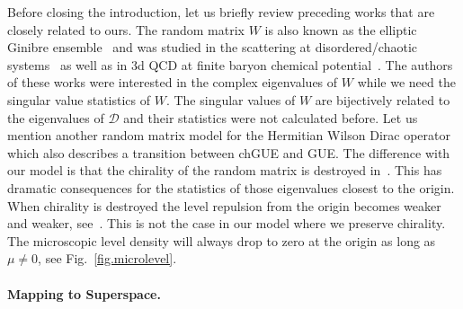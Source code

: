 \documentclass[aps,prl,reprint,graphicx,showpacs]{revtex4-1}
\begin{document}
Before closing the introduction, let us briefly review preceding works that are closely related to ours. 
The random matrix $W$ is also known as the elliptic Ginibre ensemble~\cite{Fyodorov:1997,Akemann:2001bf,Akemann:2007rf} and was studied in the scattering at disordered/chaotic systems~\cite{Fyodorov:1997b} as well as in 3d QCD at finite baryon chemical potential~\cite{Akemann:2001bf,Akemann:2007rf}. The authors of these works were interested in the complex eigenvalues of $W$ while we need the singular value statistics of $W$. The singular values of $W$ are bijectively related to the eigenvalues of $\mathcal{D}$ and their statistics were not calculated before. Let us mention another random matrix model for the Hermitian Wilson Dirac operator~\cite{Damgaard:2010cz,Akemann:2011} which also describes a transition between chGUE and GUE.  The difference with our model is that the chirality of the random matrix is destroyed in~\cite{Damgaard:2010cz,Akemann:2011}. This has dramatic consequences for the statistics of those eigenvalues closest to the origin. When chirality is destroyed the level repulsion from the origin becomes weaker and weaker, see~\cite{Damgaard:2010cz,Akemann:2011}. This is not the case in our model where we preserve chirality. The microscopic level density will always drop to zero at the origin as long as $\mu\neq0$, see Fig.~\ref{fig.microlevel}. 



\paragraph{Mapping to Superspace.}
\end{document}
